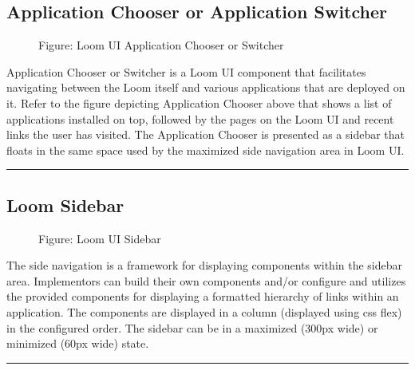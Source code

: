 \documentclass[letterpaper,10pt,english]{sphinxmanual}
\begin{document}
\subsection{Application Chooser or Application Switcher}
\label{\detokenize{loom_getting_started_guide:gsg-loom-app-switcher}}\label{\detokenize{loom_getting_started_guide:application-chooser-or-application-switcher}}
\begin{figure}[htbp]
\centering
\capstart

\noindent{}
\caption{Figure: Loom UI Application Chooser or Switcher}\label{\detokenize{loom_getting_started_guide:id31}}\end{figure}

Application Chooser or Switcher is a Loom UI component that facilitates navigating between the Loom itself and various applications that are deployed on it. Refer to the figure depicting Application Chooser above that shows a list of applications installed on top, followed by the pages on the Loom UI and recent links the user has visited. The Application Chooser is presented as a sidebar that floats in the same space used by the maximized side navigation area in Loom UI.


\bigskip\hrule\bigskip



\subsection{Loom Sidebar}
\label{\detokenize{loom_getting_started_guide:loom-sidebar}}\label{\detokenize{loom_getting_started_guide:gsg-loom-sidebar}}
\begin{figure}[htbp]
\centering
\capstart

\noindent{}
\caption{Figure: Loom UI Sidebar}\label{\detokenize{loom_getting_started_guide:id32}}\end{figure}

The side navigation is a framework for displaying components within the sidebar area. Implementors can build their own components and/or configure and utilizes the provided components for displaying a formatted hierarchy of links within an application. The components are displayed in a column (displayed using css flex) in the configured order. The sidebar can be in a maximized (300px wide) or minimized (60px wide) state.


\bigskip\hrule\bigskip
\end{document}
